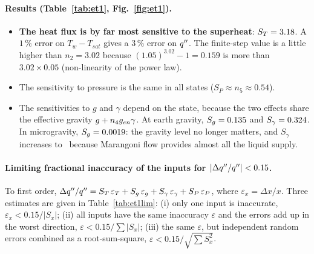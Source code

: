 \paragraph{Results (Table~\ref{tab:et1}, Fig.~\ref{fig:et1}).}
\begin{itemize}
  \item \textbf{The heat flux is by far most sensitive to the superheat}: $S_T=3.18$. A $1\,\%$ error
        on $T_w-T_{sat}$ gives a $3\,\%$ error on $q''$. The finite-step value is a little higher than
        $n_2=3.02$ because $(1.05)^{3.02}-1=0.159$ is more than $3.02\times0.05$ (non-linearity of the
        power law).
  \item The sensitivity to pressure is the same in all states ($S_P\approx n_5\approx0.54$).
  \item The sensitivities to $g$ and $\gamma$ depend on the state, because the two effects share the
        effective gravity $g+n_4g_{en}\gamma$. At earth gravity, $S_g=0.135$ and $S_\gamma=0.324$.
        In microgravity, $S_g=0.0019$: the gravity level no longer matters, and $S_\gamma$ increases
        to \EtOneSgamLow\ because Marangoni flow provides almost all the liquid supply.
\end{itemize}

\paragraph{Limiting fractional inaccuracy of the inputs for $|\Delta q''/q''|<0.15$.}
To first order,
$\Delta q''/q''=S_T\,\varepsilon_T+S_g\,\varepsilon_g+S_\gamma\,\varepsilon_\gamma+S_P\,\varepsilon_P$, where
$\varepsilon_x=\Delta x/x$. Three estimates are given in Table~\ref{tab:et1lim}:
(i) only one input is inaccurate, $\varepsilon_x<0.15/|S_x|$;
(ii) all inputs have the same inaccuracy $\varepsilon$ and the errors add up in the worst direction,
$\varepsilon<0.15/\sum|S_x|$;
(iii) the same $\varepsilon$, but independent random errors combined as a root-sum-square,
$\varepsilon<0.15/\sqrt{\sum S_x^2}$.

\begin{table}[H]
\centering\small
\caption{ET1: limiting fractional inaccuracy of the inputs for a fractional inaccuracy of the predicted
heat flux below 0.15. Last column: corresponding superheat uncertainty for case (ii).}
\label{tab:et1lim}
\end{table}


